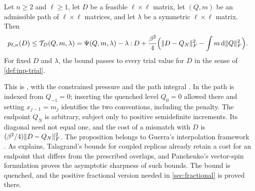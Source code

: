 \begin{proposition}\label{inp:ob-matrix}
Let $n\ge2$ and $\ell\ge1$, let $D$ be a feasible $\ell\times\ell$ matrix, let
$(Q,m)$ be an admissible path of $\ell\times\ell$ matrices, and let $\lambda$ be
a symmetric $\ell\times\ell$ matrix. Then
\begin{equation}\label{eq:inp-matrix}
 p_{\ell,n}(D)\le\mathcal T_D(Q,m,\lambda)
 =\Psi(Q,m,\lambda)-\lambda\mathbin{:}D
 +\frac{\beta^2}{4}\Bigl(\lVert D-Q_N\rVert_F^2-\int m\,\mathrm d\lVert Q\rVert_F^2\Bigr).
\end{equation}
For fixed $D$ and $\lambda$, the bound passes to every trial value for $D$ in the
sense of \cref{def:inp-trial}.
\end{proposition}

This is \cite[(2.11)]{oai-barriers}, with the constrained pressure
\cite[(2.9)]{oai-barriers} and the path integral \cite[(2.10)]{oai-barriers}. In
\cite{oai-barriers} the path is indexed from $Q_{-1}=0$; inserting the quenched
level $Q_0=0$ allowed there and setting $x_{j-1}=m_j$ identifies the two
conventions, including the penalty. The endpoint $Q_N$ is arbitrary, subject only
to positive semidefinite increments. Its diagonal need not equal
one, and the cost of a mismatch with $D$ is
$(\beta^2/4)\lVert D-Q_N\rVert_F^2$. The proposition belongs to Guerra's interpolation
framework \cite{guerra-2003}. As \cite[Section~2]{oai-barriers} explains,
Talagrand's bounds for coupled replicas
\cite[Propositions~3.4 and~4.4]{talagrand-2007} already retain a cost for an
endpoint that differs from the prescribed overlaps, and Panchenko's vector-spin
formulation \cite{panchenko-2018} proves the asymptotic sharpness of such
bounds. The bound is quenched, and the positive fractional version needed in
\cref{sec:fractional} is proved there.

